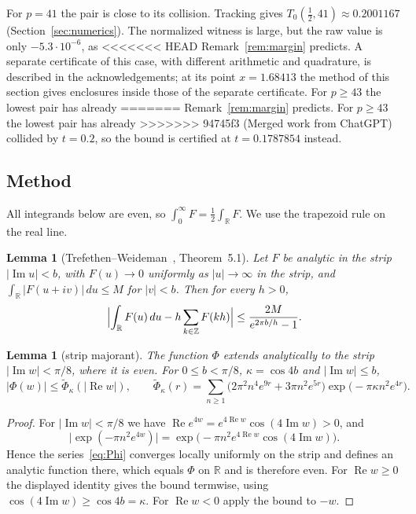 \documentclass[11pt]{article}
\numberwithin{equation}{section}
\newtheorem{lemma}[theorem]{Lemma}
\theoremstyle{definition}
\theoremstyle{remark}
\DeclareMathOperator{\Rea}{Re}
\DeclareMathOperator{\Ima}{Im}
\newcommand{\dd}{\,d}
\begin{document}
For $p=41$ the pair is close to its collision. Tracking gives
$T_0(\tfrac12,41)\approx0.2001167$ (Section~\ref{sec:numerics}). The
normalized witness is large, but the raw value is only $-5.3\cdot10^{-6}$, as
<<<<<<< HEAD
Remark~\ref{rem:margin} predicts. A separate certificate of this case, with
different arithmetic and quadrature, is described in the acknowledgements;
at its point $x=1.68413$ the method of this section gives enclosures inside
those of the separate certificate. For $p\ge43$ the lowest pair has already
=======
Remark~\ref{rem:margin} predicts. For $p\ge43$ the lowest pair has already
>>>>>>> 94745f3 (Merged work from ChatGPT)
collided by $t=0.2$, so the bound is certified at $t=0.1787854$ instead.

\subsection{Method}
All integrands below are even, so
$\int_0^\infty F=\tfrac12\int_{\mathbb R}F$. We use the trapezoid rule on the
real line.

\begin{lemma}[Trefethen--Weideman~\cite{trefethenweideman}, Theorem~5.1]
\label{lem:trap}
Let $F$ be analytic in the strip $|\Ima u|<b$, with $F(u)\to0$ uniformly as
$|u|\to\infty$ in the strip, and $\int_{\mathbb R}|F(u+iv)|\dd u\le M$ for
$|v|<b$. Then for every $h>0$,
\[
\Bigl|\int_{\mathbb R}F(u)\dd u-h\sum_{k\in\mathbb Z}F(kh)\Bigr|
\le\frac{2M}{e^{2\pi b/h}-1}.
\]
\end{lemma}

\begin{lemma}[strip majorant]\label{lem:majorant}
The function $\Phi$ extends analytically to the strip $|\Ima w|<\pi/8$, where
it is even. For $0\le b<\pi/8$, $\kappa=\cos4b$ and $|\Ima w|\le b$,
\[
|\Phi(w)|\le\widetilde\Phi_\kappa(|\Rea w|),\qquad
\widetilde\Phi_\kappa(r)=\sum_{n\ge1}\bigl(2\pi^2n^4e^{9r}+3\pi n^2e^{5r}\bigr)
\exp\bigl(-\pi\kappa n^2e^{4r}\bigr).
\]
\end{lemma}

\begin{proof}
For $|\Ima w|<\pi/8$ we have $\Rea e^{4w}=e^{4\Rea w}\cos(4\Ima w)>0$, and
\[
\bigl|\exp(-\pi n^2e^{4w})\bigr|=\exp\bigl(-\pi n^2e^{4\Rea w}\cos(4\Ima w)\bigr).
\]
Hence the series~\eqref{eq:Phi} converges locally uniformly on the strip and
defines an analytic function there, which equals $\Phi$ on $\mathbb R$ and is
therefore even. For $\Rea w\ge0$ the displayed identity gives the bound
termwise, using $\cos(4\Ima w)\ge\cos4b=\kappa$. For $\Rea w<0$ apply the bound
to $-w$.
\end{proof}
\end{document}
